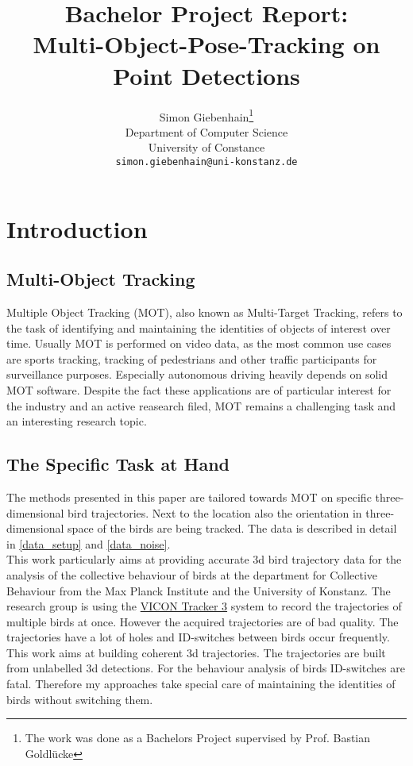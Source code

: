 \documentclass{article}
\title{Bachelor Project Report: \\ Multi-Object-Pose-Tracking on Point Detections}
\author{
  Simon Giebenhain\thanks{The work was done as a Bachelors Project supervised by Prof. Bastian Goldlücke} \\
  Department of Computer Science\\
  University of Constance\\
  \texttt{simon.giebenhain@uni-konstanz.de} \\
}
\begin{document}
\maketitle

\begin{abstract}
\end{abstract}




\section{Introduction}


\subsection{Multi-Object Tracking}

Multiple Object Tracking (MOT), also known as Multi-Target Tracking, refers to the task of identifying and maintaining the identities of objects of interest over time. Usually MOT is performed on video data, as the most common use cases are sports tracking, tracking of pedestrians and other traffic participants for surveillance purposes. Especially autonomous driving heavily depends on solid MOT software. Despite the fact these applications are of particular interest for the industry and an active reasearch filed, MOT remains a challenging task and an interesting research topic.


\subsection{The Specific Task at Hand}

The methods presented in this paper are tailored towards MOT on specific three-dimensional bird trajectories. Next to the location also the orientation in three-dimensional space of the birds are being tracked. The data is described in detail in \ref{data_setup} and \ref{data_noise}.\\
This work particularly aims at providing accurate 3d bird trajectory data for the  analysis of the collective behaviour of birds at the department for Collective Behaviour from the Max Planck Institute and the University of Konstanz. The research group is using the  \href{https://www.vicon.com/software/tracker/}{VICON Tracker 3} system
to record the trajectories of multiple birds at once. However the acquired trajectories are of bad quality. The trajectories have a lot of holes and ID-switches between birds occur frequently. This work aims at building coherent 3d trajectories. The trajectories are built from unlabelled 3d detections. 
For the behaviour analysis of birds ID-switches are fatal. Therefore my approaches take special care of maintaining the identities of birds without switching them.
\end{document}
